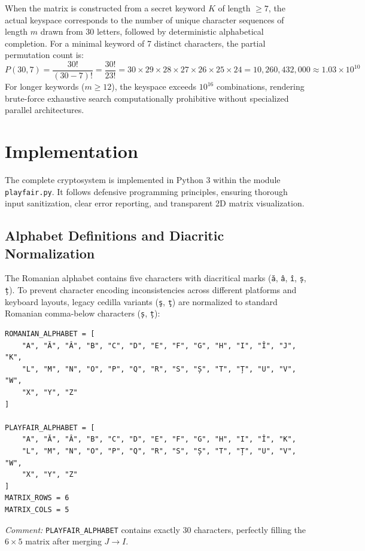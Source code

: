 \documentclass{labreport}
\begin{document}
When the matrix is constructed from a secret keyword $K$ of length $\ge 7$, the actual keyspace corresponds to the number of unique character sequences of length $m$ drawn from 30 letters, followed by deterministic alphabetical completion. For a minimal keyword of 7 distinct characters, the partial permutation count is:
\begin{equation}
P(30, 7) = \frac{30!}{(30-7)!} = \frac{30!}{23!} = 30 \times 29 \times 28 \times 27 \times 26 \times 25 \times 24 = 10,260,432,000 \approx 1.03 \times 10^{10}
\end{equation}
For longer keywords ($m \ge 12$), the keyspace exceeds $10^{16}$ combinations, rendering brute-force exhaustive search computationally prohibitive without specialized parallel architectures.

\newpage

\section{Implementation}

The complete cryptosystem is implemented in Python 3 within the module \texttt{playfair.py}. It follows defensive programming principles, ensuring thorough input sanitization, clear error reporting, and transparent 2D matrix visualization.

\subsection{Alphabet Definitions and Diacritic Normalization}
The Romanian alphabet contains five characters with diacritical marks (\texttt{ă}, \texttt{â}, \texttt{î}, \texttt{ș}, \texttt{ț}). To prevent character encoding inconsistencies across different platforms and keyboard layouts, legacy cedilla variants (\texttt{ş}, \texttt{ţ}) are normalized to standard Romanian comma-below characters (\texttt{ș}, \texttt{ț}):

\begin{lstlisting}[style=python]
ROMANIAN_ALPHABET = [
    "A", "Ă", "Â", "B", "C", "D", "E", "F", "G", "H", "I", "Î", "J", "K",
    "L", "M", "N", "O", "P", "Q", "R", "S", "Ș", "T", "Ț", "U", "V", "W",
    "X", "Y", "Z"
]

PLAYFAIR_ALPHABET = [
    "A", "Ă", "Â", "B", "C", "D", "E", "F", "G", "H", "I", "Î", "K",
    "L", "M", "N", "O", "P", "Q", "R", "S", "Ș", "T", "Ț", "U", "V", "W",
    "X", "Y", "Z"
]
MATRIX_ROWS = 6
MATRIX_COLS = 5
\end{lstlisting}
\textit{Comment:} \texttt{PLAYFAIR\_ALPHABET} contains exactly 30 characters, perfectly filling the $6 \times 5$ matrix after merging $J \to I$.
\end{document}
